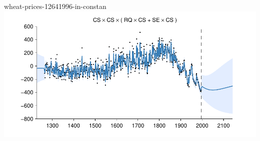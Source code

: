 \begin{frame}{wheat-prices-12641996-in-constan}
  \center
  \includegraphics[width=1.0\textwidth]{figures/wheat-prices-12641996-in-constan/wheat-prices-12641996-in-constan_all}
\end{frame}  



    
